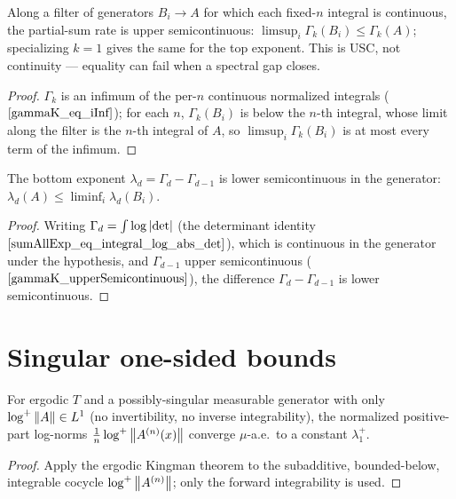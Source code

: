 \begin{theorem}\label{gammaK_upperSemicontinuous}
  \leanok
  Along a filter of generators $B_i \to A$ for which each fixed-$n$ integral is continuous, the partial-sum rate is upper semicontinuous: $\limsup_i \Gamma_k(B_i) \le \Gamma_k(A)$; specializing $k=1$ gives the same for the top exponent. This is USC, not continuity --- equality can fail when a spectral gap closes.
\end{theorem}
\begin{proof}\leanok
  $\Gamma_k$ is an infimum of the per-$n$ continuous normalized integrals ($\ref{gammaK_eq_iInf}$); for each $n$, $\Gamma_k(B_i)$ is below the $n$-th integral, whose limit along the filter is the $n$-th integral of $A$, so $\limsup_i \Gamma_k(B_i)$ is at most every term of the infimum.
\end{proof}

\begin{theorem}\label{botExp_lowerSemicontinuous}
  \leanok
  The bottom exponent $\lambda_d = \Gamma_d - \Gamma_{d-1}$ is lower semicontinuous in the generator: $\lambda_d(A) \le \liminf_i \lambda_d(B_i)$.
\end{theorem}
\begin{proof}\leanok
  Writing $\Gamma_d = \int\log\left\lvert \det \right\rvert$ (the determinant identity $\ref{sumAllExp_eq_integral_log_abs_det}$), which is continuous in the generator under the hypothesis, and $\Gamma_{d-1}$ upper semicontinuous ($\ref{gammaK_upperSemicontinuous}$), the difference $\Gamma_d - \Gamma_{d-1}$ is lower semicontinuous.
\end{proof}

\section{Singular one-sided bounds}

\begin{theorem}\label{tendsto_top_posLogNorm}
  \leanok
  For ergodic $T$ and a possibly-singular measurable generator with only $\log^+\left\lVert A \right\rVert \in L^1$ (no invertibility, no inverse integrability), the normalized positive-part log-norms $\tfrac1n\log^+\left\lVert A^{(n)}(x) \right\rVert$ converge $\mu$-a.e.\ to a constant $\lambda_1^+$.
\end{theorem}
\begin{proof}\leanok
  Apply the ergodic Kingman theorem to the subadditive, bounded-below, integrable cocycle $\log^+\left\lVert A^{(n)} \right\rVert$; only the forward integrability is used.
\end{proof}


